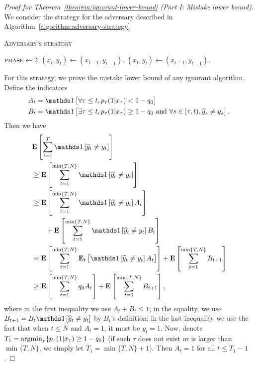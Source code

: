 \begin{proof}[Proof for Theorem~\ref{theorem:ignorant-lower-bound} (Part I: Mistake lower bound)]
We consider the strategy for the adversary described in Algorithm~\ref{algorithm:adversary-strategy}.
\begin{algorithm}[h]
\caption{\textsc{Adversary's strategy}}
\label{algorithm:adversary-strategy}
\begin{algorithmic}[1]
{
       \ELSE
          \STATE $\textsc{phase}\leftarrow 2$
       \ENDIF
       \STATE $(x_t, y_t)\leftarrow (x_{t-1}, y_{t-1})$.
    \ENDIF
\ENDFOR
{}
    \STATE $(x_t, y_t)\leftarrow (x_{t-1}, y_{t-1})$.
\ENDFOR


}
\end{algorithmic}
\end{algorithm}
For this strategy, we prove the mistake lower bound of any ignorant algorithm.
Define the indicators
\begin{align*}
A_t &= \indicator{\forall \tau\le t, p_\tau(1|x_\tau)<1-q_0} \\
B_t &= \indicator{\exists \tau\le t, p_\tau(1|x_\tau)\ge 1-q_0
 \text{\ and\ } \forall s\in[\tau,t), \widehat y_s \neq y_s}.
\end{align*}
Then we have
\begin{align}
& \mathbf{E}\left[\sum_{t=1}^{T} \indicator{\widehat y_t\neq y_t}\right] \nonumber \\
& \ge \mathbf{E}\left[\sum_{t=1}^{\min\{T,N\}} \indicator{\widehat y_t\neq y_t}\right] \nonumber \\
& \ge \mathbf{E}\left[\sum_{t=1}^{\min\{T,N\}} \indicator{\widehat y_t\neq y_t}A_t\right] \nonumber \\
& \qquad + \mathbf{E}\left[\sum_{t=1}^{\min\{T,N\}} \indicator{\widehat y_t\neq y_t}B_t\right] \nonumber \\
& = \mathbf{E}\left[\sum_{t=1}^{\min\{T,N\}} \mathbf{E}_t\left[\indicator{\widehat y_t\neq y_t}A_t\right]\right] + \mathbf{E}\left[\sum_{t=1}^{\min\{T,N\}} B_{t+1}\right] \nonumber \\
& \ge \mathbf{E}\left[\sum_{t=1}^{\min\{T,N\}} q_0 A_t\right] + \mathbf{E}\left[\sum_{t=1}^{\min\{T,N\}} B_{t+1}\right],
\label{equation:mistake_lower_bound_temp}
\end{align}
where in the first inequality we use $A_t+B_t\le 1$; in the equality, we use
$B_{t+1}=B_t\indicator{\widehat y_t\neq y_t}$ by $B_t$'s definition; in the last
inequality we use the fact that when $t\le N$ and $A_t=1$, it must be $y_t=1$.
Now, denote $T_1 = \operatorname*{argmin}_{\tau} \{ p_\tau(1|x_\tau) \ge 1-q_0 \}$ (if such
$\tau$ does not exist or is larger than $\min\{T,N\}$, we simply let
$T_1=\min\{T,N\}+1$). Then $A_t=1$ for all $t\le T_1-1$.


\end{proof}
